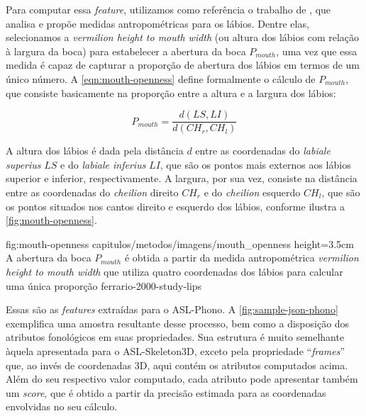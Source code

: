 \begin{enumerate}
          Para computar essa \textit{feature}, utilizamos como referência o trabalho de , que analisa e propõe medidas antropométricas para os lábios.
          Dentre elas, selecionamos a \textit{vermilion height to mouth width} (ou altura dos lábios com relação à largura da boca) para estabelecer a abertura da boca \(P_{mouth}\), uma vez que essa medida é capaz de capturar a proporção de abertura dos lábios em termos de um único número.
          A \autoref{eqn:mouth-openness} define formalmente o cálculo de \(P_{mouth}\), que consiste basicamente na proporção entre a altura e a largura dos lábios:

          \begin{equation}
              \label{eqn:mouth-openness}
              P_{mouth} = \frac{d(LS, LI)}{d(CH_r, CH_l)}
          \end{equation}

          A altura dos lábios é dada pela distância \(d\) entre as coordenadas do \textit{labiale superius} \(LS\) e do \textit{labiale inferius} \(LI\), que são os pontos mais externos aos lábios superior e inferior, respectivamente. A largura, por sua vez, consiste na distância entre as coordenadas do \textit{cheilion} direito \(CH_r\) e do \textit{cheilion} esquerdo \(CH_l\), que são os pontos situados nos cantos direito e esquerdo dos lábios, conforme ilustra a \autoref{fig:mouth-openness}.

          \figura
          {fig:mouth-openness} %
          {capitulos/metodos/imagens/mouth_openness} %
          {height=3.5cm} %
          {A abertura da boca \(P_{mouth}\) é obtida a partir da medida antropométrica \textit{vermilion height to mouth width} que utiliza quatro coordenadas dos lábios para calcular uma única proporção} %
          {ferrario-2000-study-lips} %

\end{enumerate}


Essas são as \textit{features} extraídas para o ASL-Phono.
A \autoref{fig:sample-json-phono} exemplifica uma amostra resultante desse processo, bem como a disposição dos atributos fonológicos em suas propriedades.
Sua estrutura é muito semelhante àquela apresentada para o ASL-Skeleton3D, exceto pela propriedade ``\textit{frames}'' que, ao invés de coordenadas 3D, aqui contém os atributos computados acima. Além do seu respectivo valor computado, cada atributo pode apresentar também um \textit{score}, que é obtido a partir da precisão estimada para as coordenadas envolvidas no seu cálculo.

